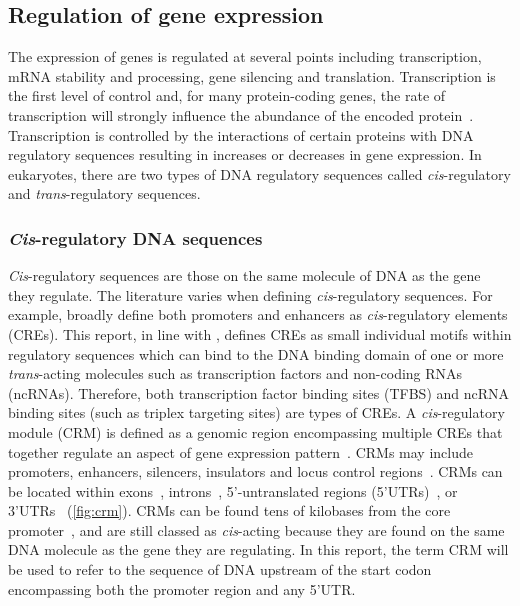 \subsection{Regulation of gene
expression}\label{regulation-of-gene-expression}
The expression of genes is regulated at several points including transcription, mRNA stability and processing, gene silencing and translation. Transcription is the first level of control and, for many protein\hyp{}coding genes, the rate of transcription will strongly influence
the abundance of the encoded protein~\autocite{liuDependencyCellularProtein2016}. Transcription is controlled by the interactions of certain proteins with DNA regulatory sequences resulting in increases or decreases in gene expression. In eukaryotes, there are two types of DNA regulatory sequences called \textit{cis}\hyp{}regulatory and \textit{trans}\hyp{}regulatory sequences.


\subsubsection{\texorpdfstring{\textit{Cis}-regulatory DNA
sequences}{Cis\hyp{}regulatory DNA sequences}}\label{cis-regulatory-dna-sequences}
\textit{Cis}\hyp{}regulatory sequences are those on the same molecule of DNA as the gene they regulate. The literature varies when defining \textit{cis}\hyp{}regulatory sequences. For example, \textcite*{wittkoppCisregulatoryElementsMolecular2012} broadly define both promoters and enhancers as \textit{cis}\hyp{}regulatory elements (CREs). This report, in line with \textcite*{swinnenLessonsDomesticationTargeting2016}, defines CREs as small individual motifs within regulatory sequences which can bind to the DNA binding domain of one or more \textit{trans}\hyp{}acting molecules such as transcription factors and non\hyp{}coding RNAs (ncRNAs). Therefore, both transcription factor binding sites (TFBS) and ncRNA binding sites (such as triplex targeting sites) are types of CREs.
A \textit{cis}\hyp{}regulatory module (CRM) is defined as a genomic region encompassing multiple CREs that together regulate an aspect of gene expression pattern~\autocite{guoNewAlgorithmIdentifying2017}. CRMs may include promoters, enhancers, silencers, insulators and locus control regions~\autocite{jeziorskaSystemsBiologyApproach2009}. CRMs can be located within exons~\autocite{tumpelRegulatoryModuleEmbedded2008}, introns~\autocite{ostrovskyIdentificationStrongIntron2018}, 5’\hyp{}untranslated regions (5’UTRs)~\autocite{bolleSegmentsEncodingUntranslated1994,henrySharedCisregulatoryModule2018}, or 3’UTRs~\autocite{palmerEnhancerControlsSnail2007,yochumGenomewideScreenBetacatenin2008} (\autoref{fig:crm}). CRMs can be found tens of kilobases from the core promoter~\autocite{bien-willnerSOX9cre1CisactingRegulatory2007,okaGenomewideMappingTranscriptional2017}, and are still classed as \textit{cis}\hyp{}acting because they are found on the same DNA molecule as the gene they are regulating. In this report, the term CRM will be used to refer to the sequence of DNA upstream of the start codon encompassing both the promoter region and any 5’UTR.

